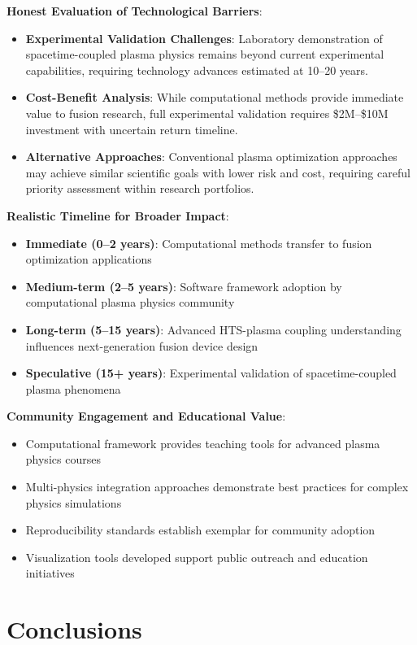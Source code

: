 \documentclass[10pt,twocolumn]{article}
\begin{document}
\textbf{Honest Evaluation of Technological Barriers}:
\begin{itemize}
\item \textbf{Experimental Validation Challenges}: Laboratory demonstration of spacetime-coupled plasma physics remains beyond current experimental capabilities, requiring technology advances estimated at 10--20 years.
\item \textbf{Cost-Benefit Analysis}: While computational methods provide immediate value to fusion research, full experimental validation requires \$2M--\$10M investment with uncertain return timeline.
\item \textbf{Alternative Approaches}: Conventional plasma optimization approaches may achieve similar scientific goals with lower risk and cost, requiring careful priority assessment within research portfolios.
\end{itemize}

\textbf{Realistic Timeline for Broader Impact}:
\begin{itemize}
\item \textbf{Immediate (0--2 years)}: Computational methods transfer to fusion optimization applications
\item \textbf{Medium-term (2--5 years)}: Software framework adoption by computational plasma physics community
\item \textbf{Long-term (5--15 years)}: Advanced HTS-plasma coupling understanding influences next-generation fusion device design
\item \textbf{Speculative (15+ years)}: Experimental validation of spacetime-coupled plasma phenomena
\end{itemize}

\textbf{Community Engagement and Educational Value}:
\begin{itemize}
\item Computational framework provides teaching tools for advanced plasma physics courses
\item Multi-physics integration approaches demonstrate best practices for complex physics simulations  
\item Reproducibility standards establish exemplar for community adoption
\item Visualization tools developed support public outreach and education initiatives
\end{itemize}

\section{Conclusions}
\end{document}
